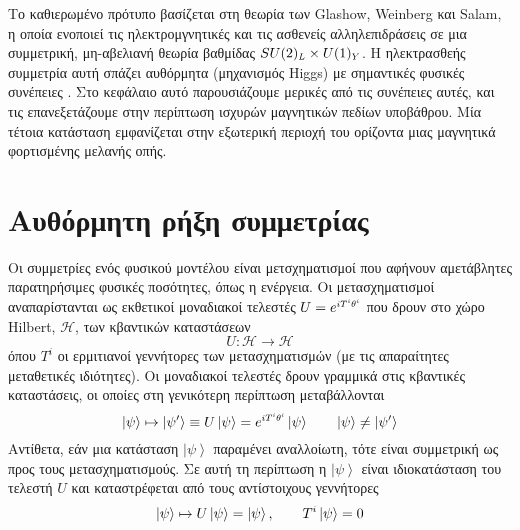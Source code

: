 Tο καθιερωμένο πρότυπο 
βασίζεται στη θεωρία των Glashow, Weinberg και Salam, η οποία ενοποιεί τις ηλεκτρομγνητικές και τις ασθενείς αλληλεπιδράσεις %
σε μια συμμετρική, μη-αβελιανή θεωρία βαθμίδας $SU(2)\subscr{L}\times U(1)\subscr{Y}$. Η ηλεκτρασθεής συμμετρία αυτή σπάζει αυθόρμητα (μηχανισμός Higgs) με σημαντικές φυσικές συνέπειες \cite{Peskin:1995ev}. Στο κεφάλαιο αυτό παρουσιάζουμε μερικές από τις συνέπειες αυτές, και τις επανεξετάζουμε στην περίπτωση ισχυρών μαγνητικών πεδίων υποβάθρου. Μία τέτοια κατάσταση εμφανίζεται στην εξωτερική περιοχή του ορίζοντα μιας μαγνητικά φορτισμένης μελανής οπής. 

\section{Αυθόρμητη ρήξη συμμετρίας}\label{spontaneous symmetry breaking}
Οι συμμετρίες ενός φυσικού μοντέλου είναι μετσχηματισμοί που αφήνουν αμετάβλητες παρατηρήσιμες φυσικές ποσότητες, όπως η ενέργεια. 
Οι μετασχηματισμοί αναπαρίστανται ως εκθετικοί μοναδιακοί τελεστές $U=e\superscr{iT\superscr{i}\theta\superscr{i}}$ που δρουν στο χώρο Hilbert, $\mathcal{H}$, των κβαντικών καταστάσεων
\begin{equation}
    U:\mathcal{H}\rightarrow\mathcal{H}
\end{equation}
όπου $T^i$ οι ερμιτιανοί γεννήτορες των μετασχηματισμών (με τις απαραίτητες μεταθετικές ιδιότητες). Οι μοναδιακοί τελεστές δρουν γραμμικά στις κβαντικές καταστάσεις, οι οποίες 
στη γενικότερη περίπτωση μεταβάλλονται
\begin{equation}\label{transformation of psi under the group of unitary operators}
    \left|\psi\right>\mapsto\left|\psi '\right>\equiv U\left|\psi\right> = e\superscr{iT\superscr{i}\theta\superscr{i}}\left|\psi\right> \qquad  \left|\psi\right>\ne \left|\psi'\right>
\end{equation}
Αντίθετα, εάν μια κατάσταση $ \left|\psi\right>$ παραμένει αναλλοίωτη, τότε είναι συμμετρική ως προς τους μετασχηματισμούς. Σε αυτή τη περίπτωση η $ \left|\psi\right>$ είναι ιδιοκατάσταση του τελεστή $U$ και καταστρέφεται από τους αντίστοιχους γεννήτορες
\begin{equation}\label{psi is symmetric under the unitary transformation of the group}
    \left|\psi\right>\mapsto U \left|\psi\right> = \left|\psi\right>, \qquad T\superscr{i} \left|\psi\right>=0
\end{equation}
\\

